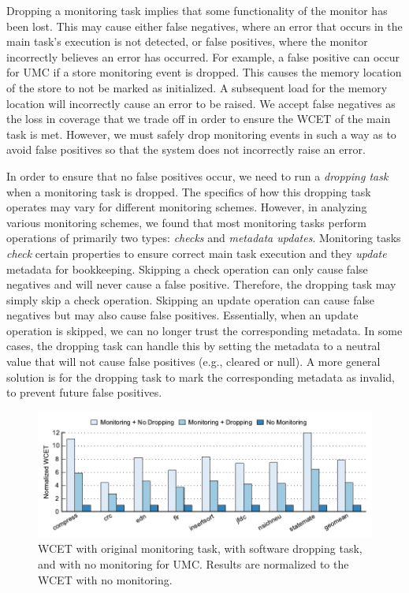 Dropping a monitoring task implies that some functionality of the monitor has
been lost.  This may cause either false negatives, where an error that occurs
in the main task's execution is not detected, or false positives, where the
monitor incorrectly believes an error has occurred.  For example, a false
positive can occur for UMC if a store monitoring event is dropped. This causes
the memory location of the store to not be marked as initialized. A subsequent
load for the memory location will incorrectly cause an error to be raised.  We
accept false negatives as the loss in coverage that we trade off in order to
ensure the WCET of the main task is met. However, we must safely drop
monitoring events in such a way as to avoid false positives so that the system
does not incorrectly raise an error.

In order to ensure that no false positives occur, we need to run a
\emph{dropping task} when a monitoring task is dropped.  The specifics of how
this dropping task operates may vary for different monitoring schemes. However,
in analyzing various monitoring schemes, we found that most monitoring tasks
perform operations of primarily two types: \emph{checks} and \emph{metadata
updates}. Monitoring tasks \emph{check} certain properties to ensure correct
main task execution and they \emph{update} metadata for bookkeeping. Skipping a
check operation can only cause false negatives and will never cause a false
positive. Therefore, the dropping task may simply skip a check operation.
Skipping an update operation can cause false negatives but may also cause false
positives.  Essentially, when an update operation is skipped, we can no longer
trust the corresponding metadata. In some cases, the dropping task can handle
this by setting the metadata to a neutral value that will not cause false
positives (e.g., cleared or null). A more general solution is for the dropping
task to mark the corresponding metadata as invalid, to prevent future false
positives.

\begin{figure}
  \begin{center}
    \includegraphics{monitoring_hard_drop/data/sw_drop_wcet.pdf}
    \caption{WCET with original monitoring task, with software dropping task,
    and with no monitoring for UMC. Results are normalized to the WCET with no
    monitoring.}
    \label{fig:monitoring_hard_drop.drop.sw_drop_wcet} 
  \end{center}
\end{figure}

